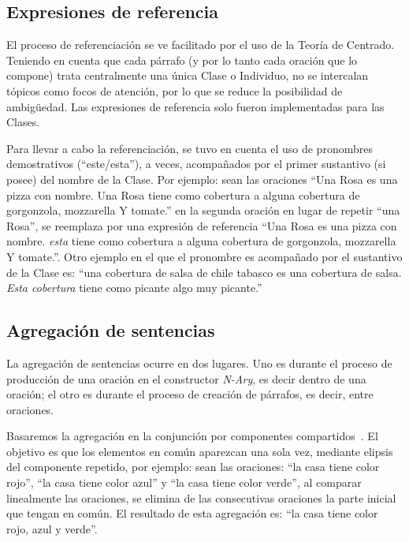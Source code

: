 \subsection{Expresiones de referencia}
El proceso de referenciación se ve facilitado por el uso de la Teoría de Centrado. 
Teniendo en cuenta que cada párrafo (y por lo tanto cada oración que lo compone) trata centralmente una única Clase o Individuo, no se intercalan tópicos como focos de atención, por lo que se reduce la posibilidad de ambigüedad. Las expresiones de referencia solo fueron implementadas para las Clases.

Para llevar a cabo la referenciación, se tuvo en cuenta el uso de pronombres demostrativos (``este/esta''), a veces, acompañados por el primer sustantivo (si posee) del nombre de la Clase. Por ejemplo: sean las oraciones ``Una Rosa es una pizza con nombre. Una Rosa tiene como cobertura a alguna cobertura de gorgonzola, mozzarella Y tomate.'' en la segunda oración en lugar de repetir ``una Rosa'', se reemplaza por una expresión de referencia ``Una Rosa es una pizza con nombre. \emph{esta} tiene como cobertura a alguna cobertura de gorgonzola, mozzarella Y tomate.''. Otro ejemplo en el que el pronombre es acompañado por el sustantivo de la Clase es: ``una cobertura de salsa de chile tabasco es una cobertura de salsa. \emph{Esta cobertura} tiene como picante algo muy picante.''


\subsection{Agregación de sentencias}
La agregación de sentencias ocurre en dos lugares. Uno es durante el proceso de producción de una oración en el constructor \emph{N-Ary}, es decir dentro de una oración; el otro es durante el proceso de creación de párrafos, es decir, entre oraciones.

Basaremos la agregación en la conjunción por componentes compartidos~\cite{bernardos2003marco}. El objetivo es que los elementos en común aparezcan una sola vez, mediante elipsis del componente repetido, por ejemplo: sean las oraciones: ``la casa tiene color rojo'', ``la casa tiene color azul'' y ``la casa tiene color verde'', al comparar linealmente las oraciones, se elimina de las consecutivas oraciones la parte inicial que tengan en común. El resultado de esta agregación es: ``la casa tiene color rojo, azul y verde''.
    
